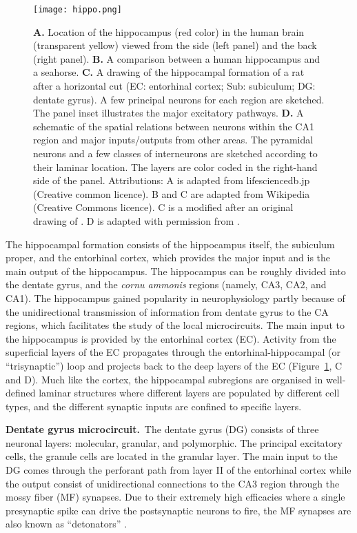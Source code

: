     \begin{figure}
      \center
      \texttt{[image: hippo.png]}
      \caption{
        {\bf A.} Location of the hippocampus (red color) in the human brain
        (transparent yellow) viewed from the side (left panel) and the back
        (right panel).
        {\bf B.} A comparison between a human hippocampus and a seahorse.
        {\bf C.} A drawing of the hippocampal formation of a rat after a
        horizontal cut (EC: entorhinal cortex; Sub: subiculum; DG: dentate
        gyrus). A few principal neurons for each region are sketched. The
        panel inset illustrates the major excitatory pathways.
        {\bf D.} A schematic of the spatial relations between neurons within
        the CA1 region and major inputs/outputs from other areas. The pyramidal
        neurons and a few classes of interneurons are sketched according to
        their laminar location. The layers are color coded in the right-hand
        side of the panel.
        Attributions:
        A is adapted from lifesciencedb.jp (Creative common licence). B and C
        are adapted from Wikipedia (Creative Commons licence). C is a modified
        after an original drawing of \cite{Cajal1911}. D is adapted with
        permission from \cite{Somogyi2014}.
             }
    \label{fig:hp}
    \end{figure}

    The hippocampal formation consists of the hippocampus itself, the
    subiculum proper, and the entorhinal cortex,
    which provides the major input and is the main output of the hippocampus.
    The hippocampus can be roughly divided into the dentate gyrus, and the {\it cornu
    ammonis} regions (namely, CA3, CA2, and CA1). The hippocampus gained
    popularity in neurophysiology partly because of the unidirectional
    transmission of information from dentate gyrus to the CA regions, which
    facilitates the study of the local microcircuits. The main input to the
    hippocampus is provided by the entorhinal cortex (EC). Activity from the
    superficial layers of the EC propagates through the entorhinal-hippocampal
    (or ``trisynaptic'') loop and projects back to the deep layers of the EC
    (Figure~\ref{fig:hp}, C and D). Much like the cortex, the
    hippocampal subregions are organised in well-defined laminar structures
    where different layers are populated by different cell types, and the
    different synaptic inputs are confined to specific layers. 

    \textbf{Dentate gyrus microcircuit.}\,
    The dentate gyrus (DG) consists of three neuronal layers: molecular,
    granular, and polymorphic. The principal excitatory cells, the granule
    cells are located in the granular layer. The main input to the DG comes
    through the perforant path from layer II of the entorhinal cortex
    \citep{Squire1992} while the output consist of unidirectional connections
    to the CA3 region through the mossy fiber (MF) synapses. Due to their
    extremely high efficacies where a single presynaptic spike can drive the
    postsynaptic neurons to fire, the MF synapses are also known as
    ``detonators'' \citep{Bischofberger2006}.


